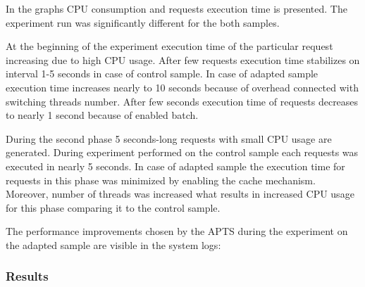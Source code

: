 \documentclass[10pt,a4paper]{article}
\begin{document}
In the graphs CPU consumption and requests execution time is presented. The experiment run was significantly different for the both samples.

At the beginning of the experiment execution time of the particular request increasing due to high CPU usage. After few requests execution time stabilizes on interval 1-5 seconds in case of control sample. In case of adapted sample execution time increases nearly to 10 seconds because of overhead connected with switching threads number. After few seconds execution time of requests decreases to nearly 1 second because of enabled batch. 

During the second phase 5 seconds-long requests with small CPU usage are generated. During experiment performed on the control sample each requests was executed in nearly 5 seconds. In case of adapted sample the execution time for requests in this phase was minimized by enabling the cache mechanism. Moreover, number of threads was increased what results in increased CPU usage for this phase comparing it to the control sample.   

The performance improvements chosen by the APTS during the experiment on the adapted sample are visible in the system logs: 

\vspace{1mm}\noindent{}\vspace{1mm}

\subsubsection{Results} 
\end{document}
